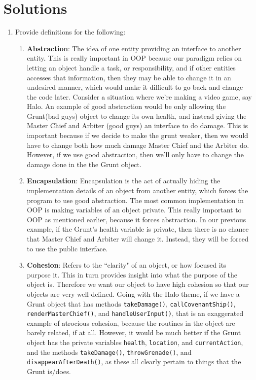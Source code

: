 \documentclass[12pt]{article}
\begin{document}
\renewcommand{\headrulewidth}{0.4pt}


\vspace{-3mm}

\section{Solutions}

\begin{enumerate}

	\item Provide definitions for the following:
	\begin{enumerate}
		\item \textbf{Abstraction}: The idea of one entity providing an interface to another entity. This is really important in OOP because our paradigm relies on letting an object handle a task, or responsibility, and if other entities accesses that information, then they may be able to change it in an undesired manner, which would make it difficult to go back and change the code later. Consider a situation where we're making a video game, say Halo. An example of good abstraction would be only allowing the Grunt(bad guys) object to change its own health, and instead giving the Master Chief and Arbiter (good guys) an interface to do damage. This is important because if we decide to make the grunt weaker, then we would have to change both how much damage Master Chief and the Arbiter do. However, if we use good abstraction, then we'll only have to change the damage done in the the Grunt object.
		\item \textbf{Encapsulation}: Encapsulation is the act of actually hiding the implementation details of an object from another entity, which forces the program to use good abstraction. The most common implementation in OOP is making variables of an object private. This really important to OOP as mentioned earlier, because it forces abstraction. In our previous example, if the Grunt's health variable is private, then there is no chance that Master Chief and Arbiter will change it. Instead, they will be forced to use the public interface.
		\item \textbf{Cohesion}: Refers to the ``clarity" of an object, or how focused its purpose it. This in turn provides insight into what the purpose of the object is. Therefore we want our object to have high cohesion so that our objects are very well-defined. Going with the Halo theme, if we have a Grunt object that has methods \texttt{takeDamage()}, \texttt{callCovenantShip()}, \texttt{renderMasterChief()}, and \texttt{handleUserInput()}, that is an exaggerated example of atrocious cohesion, because the routines in the object are barely related, if at all. However, it would be much better if the Grunt object has the private variables \texttt{health}, \texttt{location}, and \texttt{currentAction}, and the methods \texttt{takeDamage()}, \texttt{throwGrenade()}, and \texttt{disappearAfterDeath()}, as these all clearly pertain to things that the Grunt is/does.

\end{enumerate}
\end{enumerate}
\end{document}
